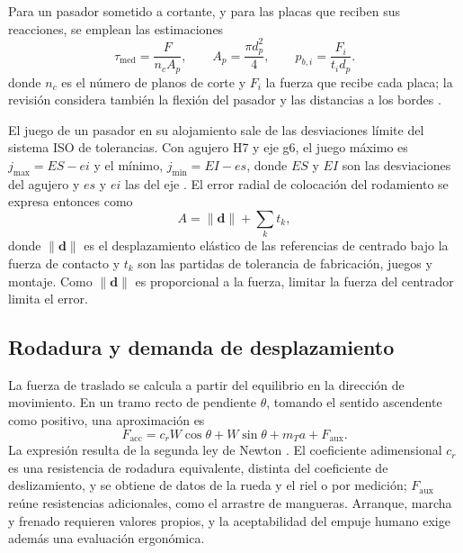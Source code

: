 Para un pasador sometido a cortante, y para las placas que reciben sus reacciones, se emplean las estimaciones
\begin{equation}
  \tau_{\mathrm{med}}=\frac{F}{n_cA_p},\qquad A_p=\frac{\pi d_p^2}{4},\qquad
  p_{b,i}=\frac{F_i}{t_id_p}.
  \label{eq:mt-pasador}
\end{equation}
donde $n_c$ es el número de planos de corte y $F_i$ la fuerza que recibe cada placa; la revisión considera también la flexión del pasador y las distancias a los bordes \cite{shigley2015}.

El juego de un pasador en su alojamiento sale de las desviaciones límite del sistema ISO de tolerancias. Con agujero H7 y eje g6, el juego máximo es $j_{\max}=ES-ei$ y el mínimo, $j_{\min}=EI-es$, donde $ES$ y $EI$ son las desviaciones del agujero y $es$ y $ei$ las del eje \cite{iso286}. El error radial de colocación del rodamiento se expresa entonces como
\begin{equation}
  A=\lVert\mathbf{d}\rVert+\sum_k t_k,
  \label{eq:mt-colocacion}
\end{equation}
donde $\lVert\mathbf{d}\rVert$ es el desplazamiento elástico de las referencias de centrado bajo la fuerza de contacto y $t_k$ son las partidas de tolerancia de fabricación, juegos y montaje. Como $\lVert\mathbf{d}\rVert$ es proporcional a la fuerza, limitar la fuerza del centrador limita el error.

\subsection{Rodadura y demanda de desplazamiento}

La fuerza de traslado se calcula a partir del equilibrio en la dirección de movimiento. En un tramo recto de pendiente $\theta$, tomando el sentido ascendente como positivo, una aproximación es
\begin{equation}
  F_{\mathrm{acc}}=c_rW\cos\theta+W\sin\theta+m_Ta+F_{\mathrm{aux}}.
  \label{eq:teo-rodadura}
\end{equation}
La expresión resulta de la segunda ley de Newton \cite{shigley2015}. El coeficiente adimensional $c_r$ es una resistencia de rodadura equivalente, distinta del coeficiente de deslizamiento, y se obtiene de datos de la rueda y el riel o por medición; $F_{\mathrm{aux}}$ reúne resistencias adicionales, como el arrastre de mangueras. Arranque, marcha y frenado requieren valores propios, y la aceptabilidad del empuje humano exige además una evaluación ergonómica.

